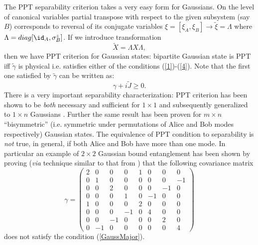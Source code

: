 \documentclass[rmp,12pt,preprint]{revtex4-2}
\begin{document}
The PPT separability criterion takes a very easy form for
Gaussians. On the level of canonical variables partial transpose with
respect to the given subsystem (say $B$) corresponds to reversal of
its conjugate variables $\xi=[\xi_{A},\xi_{B}] \rightarrow
\tilde{\xi}=\Lambda$ where $\Lambda=diag[\id_{A},\sigma^z_{B}]$.  If
we introduce transformation
\begin{equation}
  \tilde{X}=\Lambda X \Lambda,
\end{equation}
then we have PPT criterion for Gaussian states: bipartite Gaussian
state is PPT iff $\tilde{\gamma}$ is physical i.e. satisfies either of
the conditions (\ref{1})-(\ref{4}). Note that the first one satisfied
by $\tilde{\gamma}$ can be written as:
\begin{equation}
\gamma + i \tilde{J} \geq 0.
\end{equation}
There is a very important separability characterization: PPT criterion
has been shown to be {\it both} necessary and sufficient for $1 \times
1$ \cite{Simon,DuanGCZ1999-criterion} and subsequently generalized to
$1 \times n$ Gaussians \cite{WernerWolf}. Further the same result has
been proven for $m \times n$ ``bisymmetric'' \cite{Serafini,SerafiniAI2005}
(i.e. symmetric under permutations of Alice and Bob modes
respectively) Gaussian states. The equivalence of PPT condition to
separability is {\it not} true, in general, if both Alice and Bob have
more than one mode. In particular an example of $ 2 \times 2$ Gaussian
bound entanglement has been shown by proving ({\it via} technique
similar to that from \cite{LewensteinSanpera-bsa}) that the following
covariance matrix
\begin{equation}
\gamma=\left(\begin{array}{cccccccc}
2 & 0&0 & 0& 1&0 &0 &0\\
0 & 1&0 & 0& 0&0 &0 &-1\\
0 & 0&2 & 0& 0&0 &-1 &0\\
0 & 0&0 & 1& 0&-1 &0 &0\\
1 & 0&0 & 0& 2&0 &0 &0\\
0 & 0&0 & -1& 0&4 &0 &0\\
0 & 0&-1 & 0& 0&0 &2 &0\\
0 &-1&0 & 0& 0&0 &0 & 4
\end{array} \right)
\end{equation}
does not satisfy the condition (\ref{GaussMajor}).
\end{document}
